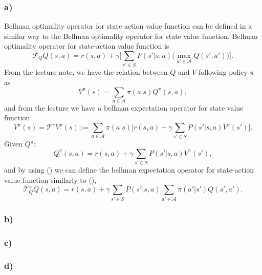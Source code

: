 \documentclass[12pt]{article}
\begin{document}
\subsubsection*{a)}
Bellman optimality operator for state-action value function can be defined in a similar way to the Bellman optimality operator for state value function. Bellman optimality operator for state-action value function is
\begin{equation}
    \mathcal{T}_QQ(s,a) = r(s,a) + \gamma\Big[\sum_{s'\in S}P(s'|s,a) \Big(\max_{a' \in \mathcal{A}}Q(s',a')\Big)\Big].
\end{equation}
From the lecture note, we have the relation between $Q$ and $V$ following policy $\pi$ as
\begin{equation}
    V^\pi(s) = \sum_{a \in \mathcal{A}}\pi(a|s)Q^\pi(s,a), 
    \label{eq:qvrelation}
\end{equation}
and from the lecture we have a bellman expectation operator for state value function
\begin{equation}
    V^\pi(s) = \mathcal{T}^\pi V^\pi(s) := \sum_{a \in \mathcal{A}} \pi(a|s) \Big[r(s,a) + \gamma \sum_{s'\in S}P(s'|s,a)V^\pi(s') \Big].
    \label{eq:vpi}
\end{equation}
Given $Q^\pi$:
\begin{equation}
    Q^\pi(s,a) = r(s,a) + \gamma\sum_{s'\in S}P(s'|s,a)V^\pi(s'),
    \label{eq:qfun}
\end{equation}
and by using () we can define the bellman expectation operator for state-action value function similarly to (),
\begin{equation}
    \mathcal{T}^\pi_QQ(s,a) = r(s,a) + \gamma \sum_{s'\in S}P(s'|s,a)\sum_{a' \in \mathcal{A}}\pi(a'|s')Q(s',a').
    \label{eq:qbellmanexpect}
\end{equation}


\subsubsection*{b)}
\subsubsection*{c)}
\subsubsection*{d)}
\end{document}
